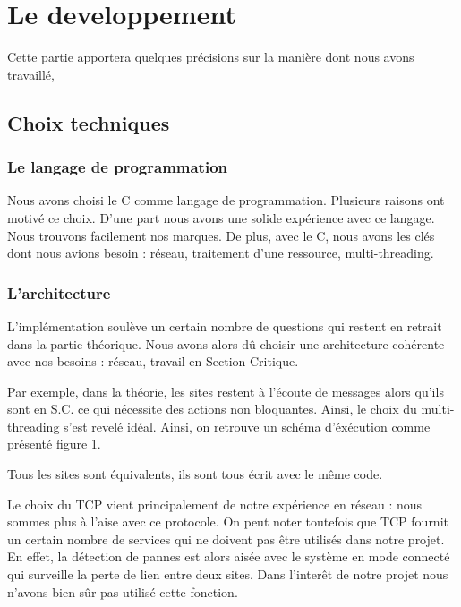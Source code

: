 \documentclass[a4paper,12pt]{article}
\begin{document}
\newpage

\section{Le developpement}

Cette partie apportera quelques précisions sur la manière dont nous avons travaillé, 

\subsection{Choix techniques}
\subsubsection{Le langage de programmation}
Nous avons choisi le C comme langage de programmation. Plusieurs raisons ont motivé ce choix. 
D'une part nous avons une solide expérience avec ce langage. Nous trouvons facilement nos marques.
De plus, avec le C, nous avons les clés dont nous avions besoin : réseau, traitement d'une ressource, multi-threading.

\subsubsection{L'architecture}

L'implémentation soulève un certain nombre de questions qui restent en retrait dans la partie théorique. Nous avons alors dû choisir une architecture cohérente avec nos besoins : réseau, travail en Section Critique.

Par exemple, dans la théorie, les sites restent à l'écoute de messages alors qu'ils sont en S.C. ce qui nécessite des actions non bloquantes. Ainsi, le choix du multi-threading s'est revelé idéal.
Ainsi, on retrouve un schéma d'éxécution comme présenté figure 1.



Tous les sites sont équivalents, ils sont tous écrit avec le même code.

Le choix du TCP vient principalement de notre expérience en réseau : nous sommes plus à l'aise avec ce protocole. 
On peut noter toutefois que TCP fournit un certain nombre de services qui ne doivent pas être utilisés dans notre projet. En effet, la détection de pannes est alors aisée avec le système en mode connecté qui surveille la perte de lien entre deux sites. Dans l'interêt de notre projet nous n'avons bien sûr pas utilisé cette fonction.
\end{document}
